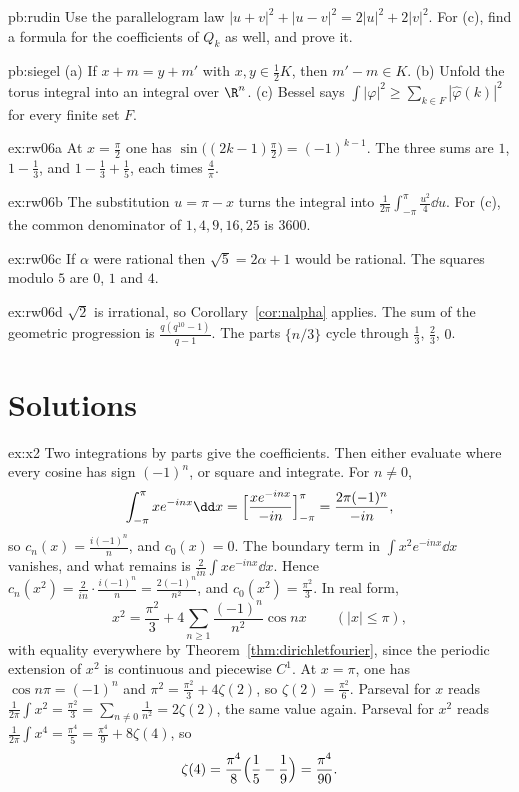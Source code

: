 \begin{hint}{pb:rudin}
Use the parallelogram law $|u+v|^2+|u-v|^2=2|u|^2+2|v|^2$. For (c), find a formula for the coefficients of $Q_k$ as well, and prove it.
\end{hint}

\begin{hint}{pb:siegel}
(a) If $x+m=y+m'$ with $x,y\in\frac12K$, then $m'-m\in K$. (b) Unfold the torus integral into an integral over $\R^n$. (c) Bessel says $\int|\varphi|^2\ge\sum_{k\in F}|\hat\varphi(k)|^2$ for every finite set $F$.
\end{hint}

\begin{hint}{ex:rw06a}
At $x=\frac\pi2$ one has $\sin\bigl((2k-1)\frac\pi2\bigr)=(-1)^{k-1}$. The three sums are $1$, $1-\frac13$, and $1-\frac13+\frac15$, each times $\frac4\pi$.
\end{hint}
\begin{hint}{ex:rw06b}
The substitution $u=\pi-x$ turns the integral into $\frac1{2\pi}\int_{-\pi}^\pi\frac{u^2}4\dd u$. For (c), the common denominator of $1,4,9,16,25$ is $3600$.
\end{hint}
\begin{hint}{ex:rw06c}
If $\alpha$ were rational then $\sqrt5=2\alpha+1$ would be rational. The squares modulo $5$ are $0$, $1$ and $4$.
\end{hint}
\begin{hint}{ex:rw06d}
$\sqrt2$ is irrational, so Corollary~\ref{cor:nalpha} applies. The sum of the geometric progression is $\frac{q(q^{10}-1)}{q-1}$. The parts $\{n/3\}$ cycle through $\frac13$, $\frac23$, $0$.
\end{hint}

\section{Solutions}

\begin{solution}{ex:x2}
\idea Two integrations by parts give the coefficients. Then either evaluate where every cosine has sign $(-1)^n$, or square and integrate.
\writeup For $n\ne0$,
\[
\int_{-\pi}^\pi xe^{-inx}\dd x=\Bigl[\frac{xe^{-inx}}{-in}\Bigr]_{-\pi}^\pi=\frac{2\pi(-1)^n}{-in},
\]
so $c_n(x)=\frac{i(-1)^n}n$, and $c_0(x)=0$. The boundary term in $\int x^2e^{-inx}\dd x$ vanishes, and what remains is $\frac2{in}\int xe^{-inx}\dd x$. Hence $c_n(x^2)=\frac2{in}\cdot\frac{i(-1)^n}n=\frac{2(-1)^n}{n^2}$, and $c_0(x^2)=\frac{\pi^2}3$. In real form,
\[
x^2=\frac{\pi^2}3+4\sum_{n\ge1}\frac{(-1)^n}{n^2}\cos nx\qquad(|x|\le\pi),
\]
with equality everywhere by Theorem~\ref{thm:dirichletfourier}, since the periodic extension of $x^2$ is continuous and piecewise $C^1$. At $x=\pi$, one has $\cos n\pi=(-1)^n$ and $\pi^2=\frac{\pi^2}3+4\zeta(2)$, so $\zeta(2)=\frac{\pi^2}6$. Parseval for $x$ reads $\frac1{2\pi}\int x^2=\frac{\pi^2}3=\sum_{n\ne0}\frac1{n^2}=2\zeta(2)$, the same value again. Parseval for $x^2$ reads $\frac1{2\pi}\int x^4=\frac{\pi^4}5=\frac{\pi^4}9+8\zeta(4)$, so
\[
\zeta(4)=\frac{\pi^4}8\Bigl(\frac15-\frac19\Bigr)=\frac{\pi^4}{90}.
\]
\end{solution}

